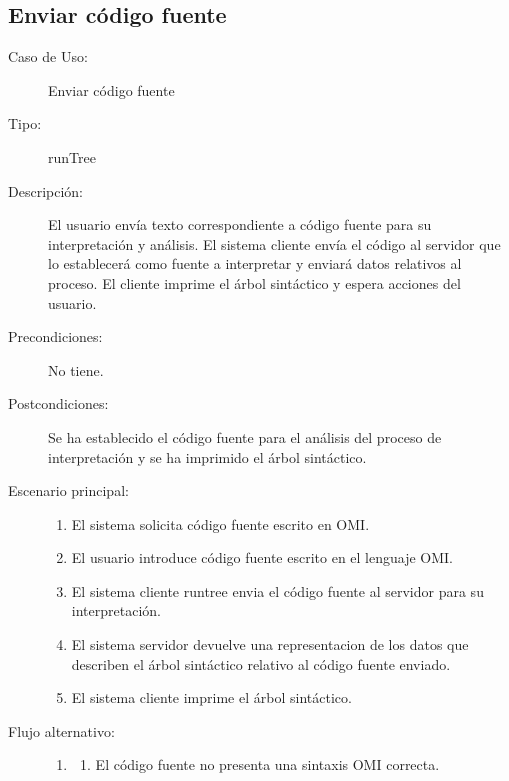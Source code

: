 \subsection{Enviar código fuente} 
\begin{framed}
\FloatBarrier
\begin{description}
   \item[Caso de Uso:]  Enviar código fuente 
   \item [Tipo:] runTree
   \item[Descripción:] 
   El usuario envía  texto correspondiente a código fuente para su interpretación y análisis. 
   El sistema cliente envía el código al servidor que lo establecerá como fuente a interpretar y enviará
   datos relativos al proceso.
   El cliente imprime el árbol sintáctico y espera acciones del usuario.
   \item[Precondiciones:] 
   No tiene.
   \item[Postcondiciones:] 
   Se ha establecido el código fuente para el análisis del proceso de interpretación y se ha imprimido el árbol sintáctico. 
   \item[Escenario principal:] \hfill
   \begin{enumerate}
   \item El sistema solicita  código fuente escrito en OMI.
   \item El usuario introduce código fuente escrito en el lenguaje OMI.
   \item El sistema cliente runtree envia el código fuente al servidor para su interpretación.
   \item El sistema servidor devuelve una representacion de los datos que describen el árbol sintáctico relativo al código fuente enviado.
   \item El sistema cliente imprime el árbol sintáctico. 
   \end{enumerate}
   \item[Flujo alternativo:] \hfill 
   \begin{enumerate} \itemsep1pt \parskip0pt 
   \setcounter{enumi}{3}
   \renewcommand{\labelenumi}{}
   \renewcommand{\labelenumiii}{\arabic{enumiii}.}
   \renewcommand{\labelenumii}{\arabic{enumi}\alph{enumii}.}
      \item 
      \begin {enumerate}
         \setcounter{enumii}{0}
         \item El código fuente no presenta una sintaxis OMI correcta.
         \begin{enumerate}

\end{enumerate}
\end{enumerate}
\end{enumerate}
\end{description}
\end{framed}
